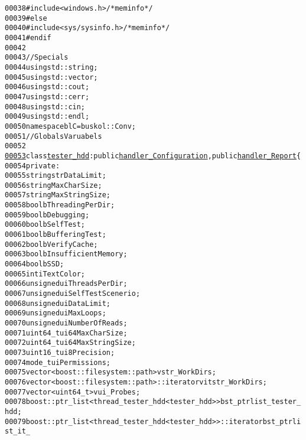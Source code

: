 \begin{footnotesize}
\begin{alltt}
00038 \textcolor{preprocessor}{}\textcolor{preprocessor}{    #include <windows.h>}\textcolor{comment}{/*mem info*/}
00039 \textcolor{preprocessor}{#else}
00040 \textcolor{preprocessor}{}\textcolor{preprocessor}{    #include <sys/sysinfo.h>}\textcolor{comment}{/*mem info*/}
00041 \textcolor{preprocessor}{#endif}
00042 \textcolor{preprocessor}{}
00043 \textcolor{comment}{//Specials}
00044 \textcolor{keyword}{using} std::string;
00045 \textcolor{keyword}{using} std::vector;
00046 \textcolor{keyword}{using} std::cout;
00047 \textcolor{keyword}{using} std::cerr;
00048 \textcolor{keyword}{using} std::cin;
00049 \textcolor{keyword}{using} std::endl;
00050 \textcolor{keyword}{namespace }blC = buskol::Conv;
00051 \textcolor{comment}{//Globals Varuabels}
00052 
\hypertarget{tester__hdd_8hpp_source_l00053}{}\hyperlink{classtester__hdd}{00053} \textcolor{keyword}{class }\hyperlink{classtester__hdd}{tester_hdd}: \textcolor{keyword}{public} \hyperlink{classhandler__Configuration}{handler_Configuration}, \textcolor{keyword}{public} \hyperlink{classhandler__Report}{handler_Report}\{
00054     \textcolor{keyword}{private}:
00055         \textcolor{keywordtype}{string} strDataLimit; 
00056         \textcolor{keywordtype}{string} MaxCharSize; 
00057         \textcolor{keywordtype}{string} MaxStringSize; 
00058         \textcolor{keywordtype}{bool} bThreadingPerDir; 
00059         \textcolor{keywordtype}{bool} bDebugging; 
00060         \textcolor{keywordtype}{bool} bSelfTest;
00061         \textcolor{keywordtype}{bool} bBufferingTest;
00062         \textcolor{keywordtype}{bool} bVerifyCache;
00063         \textcolor{keywordtype}{bool} bInsufficientMemory;
00064         \textcolor{keywordtype}{bool} bSSD;
00065         \textcolor{keywordtype}{int} iTextColor;
00066         \textcolor{keywordtype}{unsigned} uiThreadsPerDir; 
00067         \textcolor{keywordtype}{unsigned} uiSelfTestScenerio; 
00068         \textcolor{keywordtype}{unsigned} uiDataLimit; 
00069         \textcolor{keywordtype}{unsigned} uiMaxLoops;
00070         \textcolor{keywordtype}{unsigned} uiNumberOfReads;
00071         uint64\_t ui64MaxCharSize;
00072         uint64\_t ui64MaxStringSize;
00073         uint16\_t ui8Precision;
00074         mode\_t uiPermissions; 
00075         vector<boost::filesystem::path> vstr\_WorkDirs; 
00076         vector<boost::filesystem::path>::iterator vitstr\_WorkDirs; 
00077         vector<uint64\_t> vui\_Probes;
00078         boost::ptr\_list<thread\_tester\_hdd<tester\_hdd> > bst\_ptrlist\_tester\_hdd; 
00079         boost::ptr\_list<thread\_tester\_hdd<tester\_hdd> >::iterator bst\_ptrlist\_it\_

\end{alltt}
\end{footnotesize}
